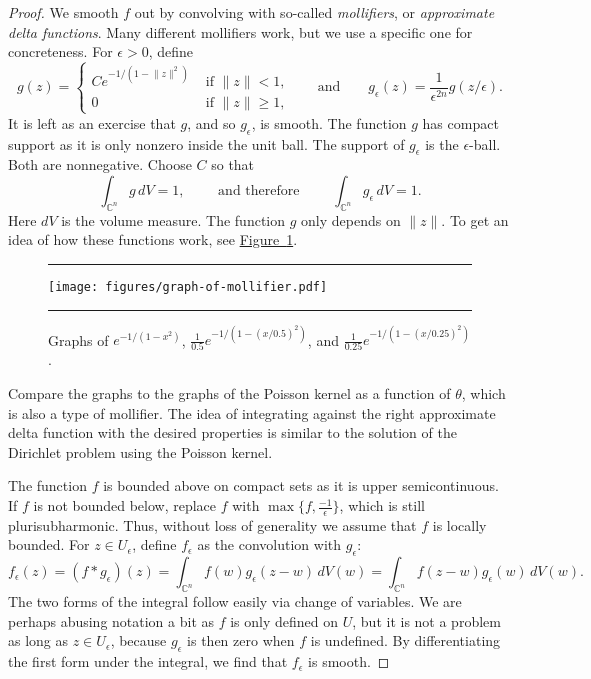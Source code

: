 \documentclass[12pt,openany]{book}
\newcommand{\snorm}[1]{\lVert {#1} \rVert}
\newcommand{\C}{{\mathbb{C}}}
\theoremstyle{plain}
\theoremstyle{remark}
\theoremstyle{definition}
\newenvironment{myfig}{%
\begin{figure}[h!t]
\noindent\rule{\textwidth}{0.5pt}\vspace{12pt}\par\centering}%
{\par\noindent\rule{\textwidth}{0.5pt}
\end{figure}}
\theoremstyle{exercise}
\theoremstyle{example}
\newcommand{\figureref}[1]{\hyperref[#1]{Figure~\ref*{#1}}}
\begin{document}
\begin{proof}
We smooth $f$ out by convolving with so-called
\emph{mollifiers}, or
\emph{approximate delta functions}.
Many different mollifiers
work, but we use a specific one for concreteness.
For $\epsilon > 0$, define
\begin{equation*}
g(z) =
\begin{cases}
C e^{-1/(1-\snorm{z}^2)} & \text{ if $\snorm{z} < 1$,}
\\
0 & \text{ if $\snorm{z} \geq 1$,}
\end{cases}
\qquad
\text{and}
\qquad
g_\epsilon(z) = \frac{1}{\epsilon^{2n}} g(z/\epsilon) .
\end{equation*}
It is left as an exercise that $g$, and so $g_\epsilon$, is smooth.
The function $g$ has compact
support as it is only nonzero inside the unit ball.  The support of
$g_\epsilon$ is the $\epsilon$-ball.  Both are nonnegative.  Choose $C$ so that
\begin{equation*}
\int_{\C^n} g\, dV = 1 ,
\qquad \text{ and therefore } \qquad
\int_{\C^n} g_\epsilon\, dV = 1 .
\end{equation*}
%
Here $dV$ is the volume measure.
The function $g$ only depends on $\snorm{z}$.
To get an idea of
how these functions work,
see \figureref{fig:graph-of-mollifier}.

\begin{myfig}
\texttt{[image: figures/graph-of-mollifier.pdf]}
\caption{Graphs of $e^{-1/(1-x^2)}$,
$\frac{1}{0.5}e^{-1/(1-{(x/0.5)}^2)}$, and
$\frac{1}{0.25}e^{-1/(1-{(x/0.25)}^2)}$.\label{fig:graph-of-mollifier}}
\end{myfig}

Compare the graphs to the graphs of the Poisson kernel as a function of
$\theta$, which is also a type of mollifier.  The idea of
integrating against the right approximate delta function with the desired properties
is similar to the solution of the Dirichlet problem using the Poisson kernel.

The function $f$ is bounded above on compact sets as it is upper semicontinuous.
If $f$ is not bounded below, replace $f$ with $\max \bigl\{ f ,
\frac{-1}{\epsilon}
\bigr\}$, which is still plurisubharmonic.  Thus, without loss of generality
we assume that $f$ is locally bounded.
For $z \in U_\epsilon$, define $f_\epsilon$ as
the convolution with $g_\epsilon$:
%
\begin{equation*}
f_\epsilon(z) = (f * g_\epsilon)(z) =
\int_{\C^n} f(w) g_\epsilon (z-w) \, dV(w) =
\int_{\C^n} f(z-w) g_\epsilon (w) \, dV(w) .
\end{equation*}
The two forms of the integral follow easily via change of variables.
We are perhaps abusing notation a bit as $f$ is only defined on $U$,
but it is not a problem as long as $z \in
U_\epsilon$, because $g_\epsilon$ is then zero when $f$ is undefined.
By differentiating the first form under the integral, we find that
$f_\epsilon$ is smooth.


\end{proof}
\end{document}
